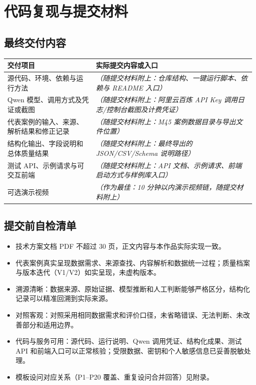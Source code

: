 \section{代码复现与提交材料}

\subsection{最终交付内容}

\begin{longtable}{@{}p{4.2cm}p{10.2cm}@{}}
\toprule
交付项目 & 实际提交内容或入口 \\
\midrule
源代码、环境、依赖与运行方法 & \emph{（随提交材料附上：仓库结构、一键运行脚本、依赖与 README 入口）} \\
Qwen 模型、调用方式及凭证或截图 & \emph{（随提交材料附上：阿里云百炼 API Key 调用日志/控制台截图及计费凭证）} \\
代表案例的输入、来源、解析结果和修正记录 & \emph{（随提交材料附上：M45 案例数据目录与导出文件位置）} \\
结构化输出、字段说明和总体质量结果 & \emph{（随提交材料附上：最终导出的 JSON/CSV/Schema 说明路径）} \\
测试 API、示例请求与可交互前端 & \emph{（随提交材料附上：API 文档、示例请求、前端启动方式与样例库入口）} \\
可选演示视频 & \emph{（作为最佳：10 分钟以内演示视频链，随提交材料附上）} \\
\bottomrule
\end{longtable}

\subsection{提交前自检清单}

\begin{itemize}[leftmargin=1.2em,itemsep=1pt]
\item [$\square$] 技术方案文档 PDF 不超过 30 页，正文内容与本作品实际实现一致。
\item [$\square$] 代表案例真实呈现数据需求、来源查找、内容解析和数据统一过程；质量档案与版本迭代（V1/V2）如实呈现，未虚构版本。
\item [$\square$] 溯源清晰：数据来源、原始证据、模型推断和人工判断能够严格区分，结构化记录可以精准回溯到实际来源。
\item [$\square$] 对照客观：对照采用相同数据需求和评价口径，未省略错误、无法判断、未改善部分和适用边界。
\item [$\square$] 代码与服务可用：源代码、运行说明、Qwen 调用凭证、结构化成果、测试 API 和前端入口可以正常核验；受限数据、密钥和个人敏感信息已妥善脱敏处理。
\item [$\square$] 模板设问对应关系（P1--P20 覆盖、重复设问合并回答）见附录。
\end{itemize}
